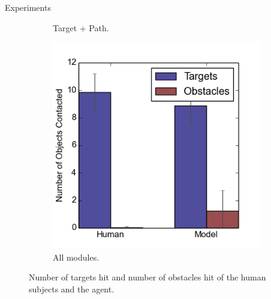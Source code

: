 \documentclass[final]{beamer}
\begin{document}
\begin{frame}{}
\begin{textblock}{86}
\begin{block}{Experiments}
\begin{figure}[h]
\begin{subfigure}[b]{0.24\textwidth}
\caption{Target + Path.}
\end{subfigure}
\begin{subfigure}[b]{0.24\textwidth}
\includegraphics[width=\textwidth]{contact4.png}
\caption{All modules.}
\end{subfigure}
\caption{Number of targets hit and number of obstacles hit of the human subjects 
and the agent.}
\label{fig:stats}
\end{figure}


\end{block}
\end{textblock}
\end{frame}
\end{document}
